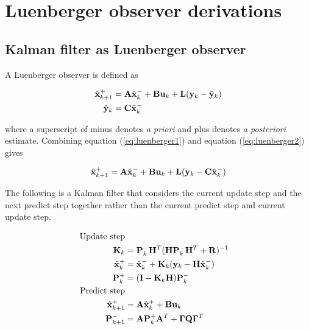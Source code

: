 \chapter{Luenberger observer derivations}

\section{Kalman filter as Luenberger observer}
\label{subsec:app-kalman-luenberger}

A Luenberger observer is defined as

\begin{align}
  \hat{\mathbf{x}}_{k+1}^+ &= \mathbf{A}\hat{\mathbf{x}}_k^- + \mathbf{B}\mathbf{u}_k + \mathbf{L}
    (\mathbf{y}_k - \hat{\mathbf{y}}_k) \label{eq:luenberger1} \\
  \hat{\mathbf{y}}_k &= \mathbf{C} \hat{\mathbf{x}}_k^- \label{eq:luenberger2}
\end{align}

where a superscript of minus denotes \textit{a priori} and plus denotes
\textit{a posteriori} estimate. Combining equation (\ref{eq:luenberger1}) and
equation (\ref{eq:luenberger2}) gives

\begin{equation} \label{eq:luenberger}
  \hat{\mathbf{x}}_{k+1}^+ = \mathbf{A}\hat{\mathbf{x}}_k^- + \mathbf{B}\mathbf{u}_k + \mathbf{L}
    (\mathbf{y}_k - \mathbf{C}\hat{\mathbf{x}}_k^-)
\end{equation}

The following is a Kalman filter that considers the current update step and the
next predict step together rather than the current predict step and current
update step.

\begin{align}
  \text{Update step} \nonumber \\
  \mathbf{K}_k &= \mathbf{P}_k^- \mathbf{H}^T (\mathbf{H}\mathbf{P}_k^- \mathbf{H}^T +
    \mathbf{R})^{-1} \\
  \hat{\mathbf{x}}_k^+ &= \hat{\mathbf{x}}_k^- + \mathbf{K}_k(\mathbf{y}_k -
    \mathbf{H}\hat{\mathbf{x}}_k^-) \label{eq:post2_x} \\
  \mathbf{P}_k^+ &= (\mathbf{I} - \mathbf{K}_k\mathbf{H})\mathbf{P}_k^- \\
  \text{Predict step} \nonumber \\
  \hat{\mathbf{x}}_{k+1}^+ &= \mathbf{A}\hat{\mathbf{x}}_k^+ + \mathbf{B}\mathbf{u}_k
    \label{eq:pre2_x} \\
  \mathbf{P}_{k+1}^- &= \mathbf{A} \mathbf{P}_k^+ \mathbf{A}^T +
    \mathbf{\Gamma}\mathbf{Q}\mathbf{\Gamma}^T
\end{align}

